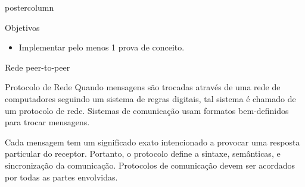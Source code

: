 \documentclass[final]{beamer}
\begin{document}
\begin{frame}
\begin{columns}
\begin{column}{.5\textwidth}
\begin{beamercolorbox}[center,wd=\textwidth]{postercolumn}
\begin{minipage}[T]{.95\textwidth}
{\begin{block}{Objetivos}
\begin{itemize}
                \item Implementar pelo menos 1 prova de conceito.
              \end{itemize}
              \vspace*{0.2cm} 
            \end{block}
            
            \vspace*{0.2cm}
            
            \begin{block}{Rede peer-to-peer}
                \center 
                                
                \vspace*{0.2cm}
            \end{block}
            
            \vspace*{0.2cm}

            \begin{block}{Protocolo de Rede}
            \justifying
                Quando mensagens são trocadas através de uma rede de computadores seguindo um sistema de regras digitais,
                tal sistema é chamado de um protocolo de rede. Sistemas de comunicação usam formatos bem-definidos para
                trocar mensagens. 
                
                \vspace*{0.4cm} 
                
                
                \vspace*{0.2cm} 
                
                Cada mensagem tem um significado exato intencionado a provocar uma resposta particular
                do receptor. Portanto, o protocolo define a sintaxe, semânticas, e sincronização da comunicação. Protocolos
                de comunicação devem ser acordados por todas as partes envolvidas.
                               

\end{block}}
\end{minipage}
\end{beamercolorbox}
\end{column}
\end{columns}
\end{frame}
\end{document}
